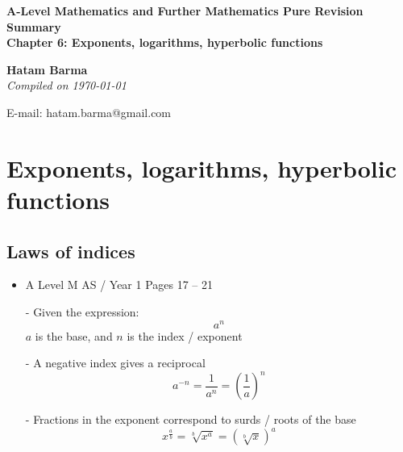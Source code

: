 \documentclass[11pt, a4paper]{article}
\begin{document}
\begin{titlepage}
   \begin{center}
       \vspace*{2.5cm}
	\huge
       \textbf{A-Level Mathematics and Further Mathematics Pure Revision Summary} \\
	\vspace{1cm}
	\Large
       \textbf{Chapter 6: Exponents, logarithms, hyperbolic functions}
            
       \vspace{1.5cm}
	\LARGE
       \textbf{Hatam Barma} \\
	\vspace{0.75cm}
       \normalsize
       \emph{Compiled on \Datea\today} \\

       \vfill
        

	E-mail: hatam.barma@gmail.com
   \end{center}
\end{titlepage}


\tableofcontents


\clearpage
\section{Exponents, logarithms, hyperbolic functions}
\vspace{0.5cm}

\subsection{Laws of indices}
\begin{itemize}
\item A Level M AS / Year 1 \hspace{1cm} \phantom{ } Pages 17 -- 21
\end{itemize} \par
\begin{itemize}
\item[-] Given the expression:
\begin{equation*}
a^{n}
\end{equation*}
$a$ is the base, and $n$ is the index / exponent
\item[-]A negative index gives a reciprocal
\begin{equation*}
a^{-n}=\frac{1}{a^{n}}=\left(\frac{1}{a}\right)^{n}
\end{equation*}
\item[-] Fractions in the exponent correspond to surds / roots of the base
\begin{equation*}
x^{\frac{a}{b}}=\sqrt[b]{x^{a}}=\left(\sqrt[b]{x}\right)^{a}
\end{equation*}
\end{itemize}
\vspace{0.5cm}
\end{document}
